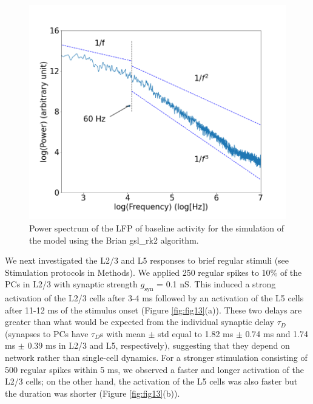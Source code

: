\begin{figure}[H]
    \centering
    \includegraphics[scale=0.3]{Figures/Fig12.png}
    \caption{Power spectrum of the LFP of baseline activity for the simulation of the model using the Brian gsl\_rk2 algorithm. }
    \label{fig:fig12}
\end{figure}

We next investigated the L2/3 and L5 responses to brief regular stimuli (see Stimulation protocols in Methods). We applied 250 regular spikes to 10\% of the PCs in L2/3 with synaptic strength $g_{\text{syn}}$ = 0.1 nS. This induced a strong activation of the L2/3 cells after 3-4 ms followed by an activation of the L5 cells after 11-12 ms of the stimulus onset (Figure \ref{fig:fig13}(a)). These two delays are greater than what would be expected from the individual synaptic delay $\tau_D$ (synapses to PCs have $\tau_D$s with mean $\pm$ std equal to 1.82 ms $\pm$ 0.74 ms and 1.74 ms $\pm$ 0.39 ms in L2/3 and L5, respectively), suggesting that they depend on network rather than single-cell dynamics. For a stronger stimulation consisting of 500 regular spikes within 5 ms, we observed a faster and longer activation of the L2/3 cells; on the other hand, the activation of the L5 cells was also faster but the duration was shorter (Figure \ref{fig:fig13}(b)).\\

